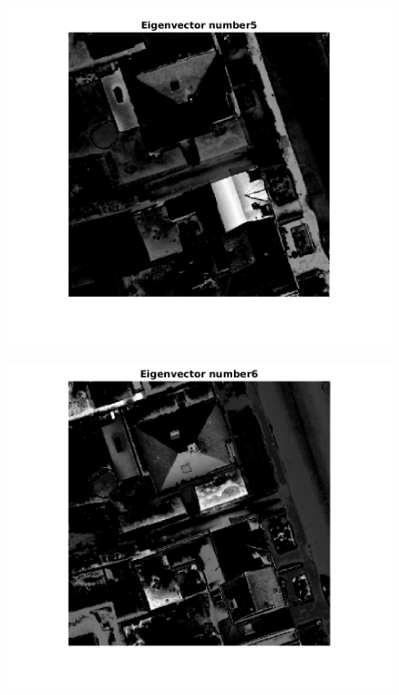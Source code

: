 \begin{figure}
\includegraphics[width=\linewidth]{evec5.png}
\end{figure}

\begin{figure}
\includegraphics[width=\linewidth]{evec6.png}
\end{figure}


